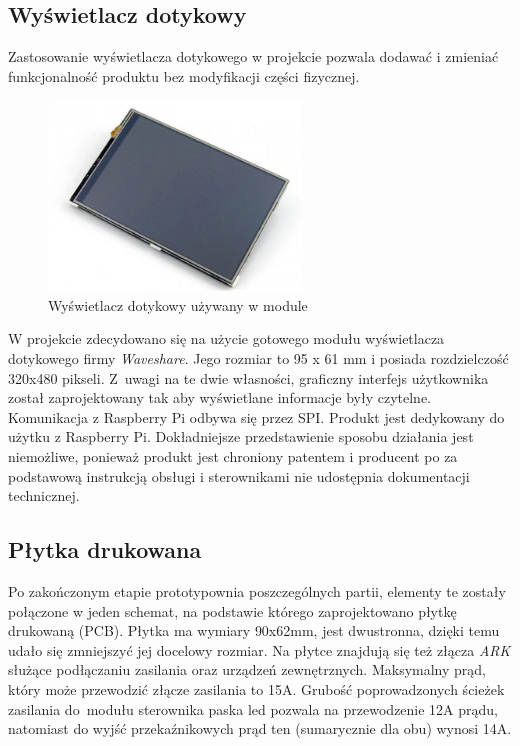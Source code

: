 \documentclass[12pt, eng, twoside, openany, final]{mgr}
\begin{document}
        \subsection{Wyświetlacz dotykowy}
        Zastosowanie wyświetlacza dotykowego w projekcie pozwala dodawać i zmieniać funkcjonalność produktu bez modyfikacji części fizycznej.
            \begin{figure}[H]
            \begin{center}
                \includegraphics[width=0.6\textwidth]{wyswietlacz.jpg}
                \caption{Wyświetlacz dotykowy używany w module} 
            \end{center}
            \end{figure}
            
            \noindent W projekcie zdecydowano się na użycie gotowego modułu wyświetlacza dotykowego firmy
            \emph{Waveshare}. Jego rozmiar to 95 x 61 mm i posiada rozdzielczość 320x480 pikseli. Z~uwagi na te dwie własności, graficzny interfejs użytkownika został zaprojektowany tak aby wyświetlane informacje były czytelne. Komunikacja z Raspberry Pi odbywa się przez SPI. Produkt jest dedykowany do użytku z Raspberry Pi. Dokładniejsze przedstawienie sposobu działania jest niemożliwe, ponieważ produkt jest chroniony patentem i producent po za podstawową instrukcją obsługi\cite{screen} i sterownikami nie udostępnia dokumentacji technicznej.

        
        \subsection{Płytka drukowana}
            Po zakończonym etapie prototypownia poszczególnych partii, elementy te zostały połączone w jeden schemat, na podstawie którego zaprojektowano płytkę drukowaną (PCB). 
            Płytka ma wymiary 90x62mm, jest dwustronna, dzięki temu udało się zmniejszyć jej docelowy rozmiar. Na płytce znajdują się też złącza \emph{ARK} służące podłączaniu zasilania oraz urządzeń zewnętrznych. Maksymalny prąd, który może przewodzić złącze zasilania to 15A. Grubość poprowadzonych ścieżek zasilania do~modułu sterownika paska led pozwala na przewodzenie 12A prądu, natomiast do wyjść przekaźnikowych prąd ten (sumarycznie dla obu) wynosi 14A. 
    
\end{document}
